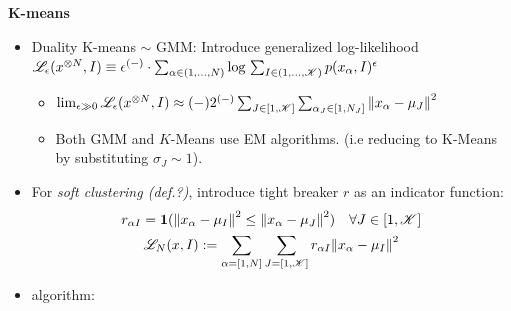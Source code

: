\begin{frame} [t] 
      {\bf K-means}
\begin{itemize}
    \item 
    Duality K-means $\sim$ GMM: 
    Introduce generalized log-likelihood 
    $ \mathscr {L} _{\epsilon} 
      (x ^{\otimes N}, I) 
      \equiv 
      \epsilon ^{(-)} \cdot 
      \sum _{\alpha \in (1,...,N)} 
      \text{log} \, 
      \sum _{I \in (1,...,\mathscr{K})}
      p (x _{\alpha} , I ) ^{\epsilon}
    $  
    \begin{itemize}
        \item 
            $ \lim _{\epsilon \gg 0} 
              \mathscr {L} _{\epsilon} 
              (x ^{\otimes N}, I)  
              \approx (-) 2 ^{(-)} 
              \sum _{J \in [1,\mathscr{K}]}
              \sum _{\alpha _{J}
              \in [1,N_{J}]} 
              \norm {x _{\alpha} - \mu _{J}}
                ^{2}
            $ 
        \item Both GMM and $K$-Means 
              use EM algorithms. 
              (i.e reducing to K-Means 
              by substituting 
              $\sigma _{J} \sim 1 $).
    \end{itemize}
    \item For {\it soft clustering (def.?)}, 
          introduce tight breaker $r$ 
          as an indicator function:
    { \footnotesize
    \begin{gather*}
    r _{\alpha I} = 
      \mathbf {1} 
        ( \norm {x _{\alpha} - \mu _{I}} ^{2}
          \leq 
          \norm {x _{\alpha} - \mu _{J}} ^{2}
        ) \quad 
        \forall J \in [1, \mathscr{K}]
    \\
       \mathscr {L} _{N} (x, I) 
      := \sum _{\alpha = [1,N]} 
         \sum _{J = [1,\mathscr{K}]}
         r _{\alpha I} 
         \norm {x _{\alpha} - \mu _{I}} ^{2}
    \end{gather*}
    }
    \item algorithm: 
\end{itemize}
\end{frame}
